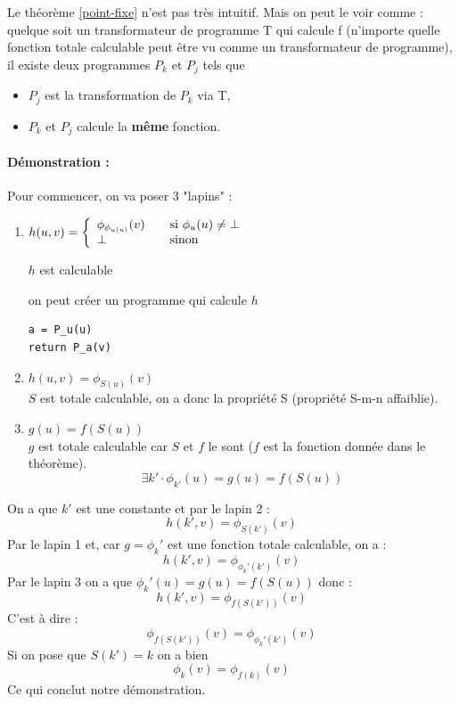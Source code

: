 \begin{myrem}
	Le théorème \ref{point-fixe} n'est pas très intuitif. Mais on peut le 
	voir comme : quelque soit un transformateur de programme T qui calcule f 
	(n'importe quelle fonction totale calculable peut être vu comme un transformateur 
	de programme), \\
	il existe deux programmes $P_k$ et $P_j$ tels que 
	\begin{itemize}
		\item $P_j$ est la transformation de $P_k$ via T,
		\item $P_k$ et $P_j$ calcule la \textbf{même} fonction.
	\end{itemize}
\end{myrem}

\paragraph{Démonstration :}
Pour commencer, on va poser 3 "lapins" :
\begin{enumerate}
		
	\item
	$ h(u,v) = \left\{
	\begin{array}{l l}
		\phi_{\phi_{u(u)}}(v) & \quad \text{si $\phi_u(u)\neq \bot$}\\
    	\bot & \quad \text{sinon}
	\end{array} \right.$
		
		$h$ est calculable 
		\begin{myrem}
			on peut créer un programme qui calcule $h$
\begin{lstlisting}
a = P_u(u)
return P_a(v)
\end{lstlisting}
		\end{myrem}
		
	\item $h(u,v)=\phi_{S(u)}(v)$\\
	 $S$ est totale calculable, on a donc la propriété S (propriété S-m-n affaiblie).
	 
	\item $g(u)=f(S(u))$\\
	 $g$ est totale calculable car $S$ et $f$ le sont ($f$
		est la fonction donnée dans le théorème).
		\[ \exists k' \cdot \phi_{k'}(u) =g(u)=f(S(u)) \]
\end{enumerate}
On a que $k'$ est une constante et par le lapin 2 :
\[h(k',v) = \phi_{S(k')}(v)\]
Par le lapin 1 et, car $g=\phi_k'$ est une fonction totale calculable, on a :
\[h(k',v) = \phi_{\phi_k'(k')}(v)\]
Par le lapin 3 on a que $\phi_k'(u) = g(u)=f(S(u))$ donc :
\[h(k',v) = \phi_{f(S(k'))}(v)\]
C'est à dire :
\[ \phi_{f(S(k'))}(v) =\phi_{\phi_k'(k')}(v) \]
Si on pose que $S(k')=k$ on a bien 
\[ \phi_{k}(v) = \phi_{f(k)}(v) \]
Ce qui conclut notre démonstration.

